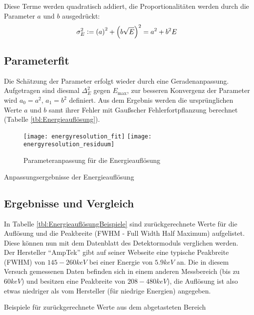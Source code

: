\documentclass{../Misc/MontavonLaTeX/Montavon}
\newcommand{\defeq}{\vcentcolon=}
\newcommand{\halfwidth}{0.48\textwidth}
\begin{document}
Diese Terme werden quadratisch addiert, die Proportionalitäten werden durch die Parameter $a$ und $b$ ausgedrückt:
\[
	\sigma_E^2 \defeq \left(a\right)^2 + \left(b \sqrt{E}\right)^2 = a^2 + b^2 E
\]

\subsection{Parameterfit}

Die Schätzung der Parameter erfolgt wieder durch eine Geradenanpassung. Aufgetragen sind diesmal $\Delta_E^2$ gegen $E_\textrm{max}$, zur besseren Konvergenz der Parameter wird $a_0 = a^2$, $a_1 = b^2$ definiert. Aus dem Ergebnis werden die ursprünglichen Werte $a$ und $b$ samt ihrer Fehler mit Gaußscher Fehlerfortpflanzung berechnet (Tabelle \ref{tbl:Energieauflösung}).

\begin{figure}[htbp]
\texttt{[image: energyresolution\_fit]}
\texttt{[image: energyresolution\_residuum]}
\caption{Parameteranpassung für die Energieauflösung}
\label{fig:Energieaufloesung}
\end{figure}


\begin{table}[htbp]
\centering

\caption{Anpassungsergebnisse der Energieauflösung}
\label{tbl:Energieauflösung}
\end{table}

\subsection{Ergebnisse und Vergleich}

In Tabelle \ref{tbl:EnergieauflösungBeispiele} sind zurückgerechnete Werte für die Auflösung und die Peakbreite (FWHM - Full Width Half Maximum) aufgelistet. Diese können nun mit dem Datenblatt des Detektormoduls verglichen werden. Der Hersteller \enquote{AmpTek} gibt auf seiner Webseite\cite{amptek} eine typische Peakbreite (FWHM) von $145 - 260 \unit{keV}$ bei einer Energie von $5.9 \unit{keV}$ an. 
Die in diesem Versuch gemessenen Daten befinden sich in einem anderen Messbereich (bis zu $60 \unit{keV}$) und besitzen eine Peakbreite von $208 - 480 \unit{keV}$), die Auflösung ist also etwas niedriger als vom Hersteller (für niedrige Energien) angegeben.

\begin{table}[htbp]
\centering

\caption{Beispiele für zurückgerechnete Werte aus dem abgetasteten Bereich}
\label{tbl:EnergieauflösungBeispiele}
\end{table}
\end{document}
